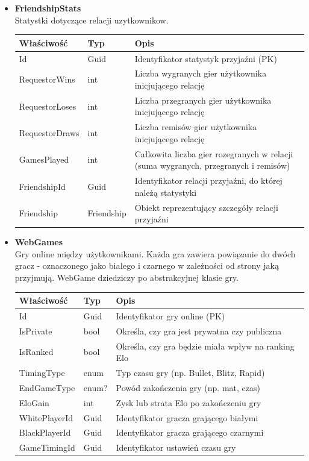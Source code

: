 \documentclass[12pt,a4paper]{article}
\begin{document}
\begin{itemize}
    \item \textbf{FriendshipStats}\\
    Statystki dotyczące relacji uzytkownikow.
    \renewcommand{\arraystretch}{1.5}
    \begin{longtable}{|m{4cm}|m{2cm}|m{8cm}|}
        \hline
        \rowcolor{lightgray}
        \textbf{Właściwość} & \textbf{Typ} & \textbf{Opis} \\ \hline
        \endhead
        \hline
        Id & Guid & Identyfikator statystyk przyjaźni (PK) \\ \hline
        RequestorWins & int & Liczba wygranych gier użytkownika inicjującego relację \\ \hline
        RequestorLoses & int & Liczba przegranych gier użytkownika inicjującego relację \\ \hline
        RequestorDraws & int & Liczba remisów gier użytkownika inicjującego relację \\ \hline
        GamesPlayed & int & Całkowita liczba gier rozegranych w relacji (suma wygranych, przegranych i remisów) \\ \hline
        FriendshipId & Guid & Identyfikator relacji przyjaźni, do której należą statystyki \\ \hline
        Friendship & Friendship & Obiekt reprezentujący szczegóły relacji przyjaźni \\ \hline
    \end{longtable}
  
\newpage
    
    \item \textbf{WebGames}\\
    Gry online między użytkownikami. Każda gra zawiera powiązanie do dwóch gracz - oznaczonego jako białego i czarnego w zależności od strony jaką przyjmują. WebGame dziedziczy po abstrakcyjnej klasie gry.
    \renewcommand{\arraystretch}{1.5}
    \begin{longtable}{|m{4cm}|m{2cm}|m{8cm}|}
        \hline
        \rowcolor{lightgray}
        \textbf{Właściwość} & \textbf{Typ} & \textbf{Opis} \\ \hline
        \endhead
        \hline
        Id & Guid & Identyfikator gry online (PK) \\ \hline
        IsPrivate & bool & Określa, czy gra jest prywatna czy publiczna \\ \hline
        IsRanked & bool & Określa, czy gra będzie miała wpływ na ranking Elo \\ \hline
        TimingType & enum & Typ czasu gry (np. Bullet, Blitz, Rapid) \\ \hline
        EndGameType & enum? & Powód zakończenia gry (np. mat, czas) \\ \hline
        EloGain & int & Zysk lub strata Elo po zakończeniu gry \\ \hline
        WhitePlayerId & Guid & Identyfikator gracza grającego białymi \\ \hline
        BlackPlayerId & Guid & Identyfikator gracza grającego czarnymi \\ \hline
        GameTimingId & Guid & Identyfikator ustawień czasu gry \\ \hline
    \end{longtable}


\end{itemize}
\end{document}
